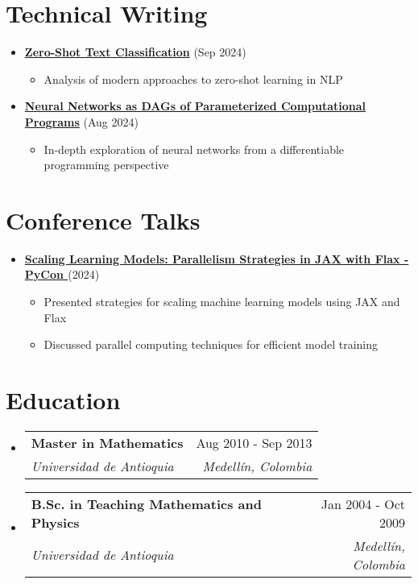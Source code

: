 \documentclass[letterpaper,11pt]{article}
\makeatletter
\newcommand{\resumeSubheading}[4]{
  \vspace{-2pt}
  \item[]
  \begin{tabular*}{\textwidth}{@{\extracolsep{\fill}}l r}
    \textbf{#1} & #2 \\
    \textit{#3} & \textit{#4} \\
  \end{tabular*}
  \vspace{-5pt}
}
\newcommand{\normalfaYoutube}{{\mdseries\faYoutube}}
\makeatother
\begin{document}
\section{Technical Writing}
\begin{itemize}[leftmargin=*]
    \item \textbf{\href{https://www.asanchezyali.com/blog/ai/20240917ZeroShot}{Zero-Shot Text Classification}} (Sep 2024)
    \begin{itemize}
        \item Analysis of modern approaches to zero-shot learning in NLP
    \end{itemize}
    
    \item \textbf{\href{https://www.asanchezyali.com/blog/differentiable-programming/20240923DifferentiablePrograms}{Neural Networks as DAGs of Parameterized Computational Programs}} (Aug 2024)
    \begin{itemize}
        \item In-depth exploration of neural networks from a differentiable programming perspective
    \end{itemize}
\end{itemize}

\section{Conference Talks}
\begin{itemize}[leftmargin=*]
    \item \textbf{\href{https://www.youtube.com/watch?v=m4hP1soE414}{Scaling Learning Models: Parallelism Strategies in JAX with Flax - PyCon \normalfaYoutube}} (2024)
    \begin{itemize}
        \item Presented strategies for scaling machine learning models using JAX and Flax
        \item Discussed parallel computing techniques for efficient model training
    \end{itemize}
\end{itemize}

\section{Education}
\begin{itemize}[leftmargin=0pt, itemindent=0pt, label={}]
\resumeSubheading
{Master in Mathematics}{Aug 2010 - Sep 2013}
{Universidad de Antioquia}{Medellín, Colombia}

\resumeSubheading
{B.Sc. in Teaching Mathematics and Physics}{Jan 2004 - Oct 2009}
{Universidad de Antioquia}{Medellín, Colombia}
\end{itemize}
\end{document}
